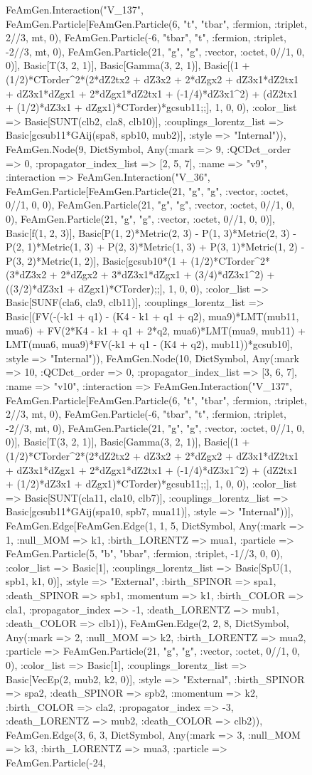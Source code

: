 \documentclass{revtex4}
\begin{document}
\begin{figure}[!htb]
\begin{center}
{FeAmGen.Interaction("V_137", FeAmGen.Particle[FeAmGen.Particle(6, "t", "tbar", :fermion, :triplet, 2//3, mt, 0), FeAmGen.Particle(-6, "tbar", "t", :fermion, :triplet, -2//3, mt, 0), FeAmGen.Particle(21, "g", "g", :vector, :octet, 0//1, 0, 0)], Basic[T(3, 2, 1)], Basic[Gamma(3, 2, 1)], Basic[(1 + (1/2)*CTorder^2*(2*dZ2tx2 + dZ3x2 + 2*dZgx2 + dZ3x1*dZ2tx1 + dZ3x1*dZgx1 + 2*dZgx1*dZ2tx1 + (-1/4)*dZ3x1^2) + (dZ2tx1 + (1/2)*dZ3x1 + dZgx1)*CTorder)*gcsub11;;], 1, 0, 0), :color_list => Basic[SUNT(clb2, cla8, clb10)], :couplings_lorentz_list => Basic[gcsub11*GAij(spa8, spb10, mub2)], :style => "Internal")), FeAmGen.Node(9, Dict{Symbol, Any}(:mark => 9, :QCDct_order => 0, :propagator_index_list => [2, 5, 7], :name => "v9", :interaction => FeAmGen.Interaction("V_36", FeAmGen.Particle[FeAmGen.Particle(21, "g", "g", :vector, :octet, 0//1, 0, 0), FeAmGen.Particle(21, "g", "g", :vector, :octet, 0//1, 0, 0), FeAmGen.Particle(21, "g", "g", :vector, :octet, 0//1, 0, 0)], Basic[f(1, 2, 3)], Basic[P(1, 2)*Metric(2, 3) - P(1, 3)*Metric(2, 3) - P(2, 1)*Metric(1, 3) + P(2, 3)*Metric(1, 3) + P(3, 1)*Metric(1, 2) - P(3, 2)*Metric(1, 2)], Basic[gcsub10*(1 + (1/2)*CTorder^2*(3*dZ3x2 + 2*dZgx2 + 3*dZ3x1*dZgx1 + (3/4)*dZ3x1^2) + ((3/2)*dZ3x1 + dZgx1)*CTorder);;], 1, 0, 0), :color_list => Basic[SUNF(cla6, cla9, clb11)], :couplings_lorentz_list => Basic[(FV(-(-k1 + q1) - (K4 - k1 + q1 + q2), mua9)*LMT(mub11, mua6) + FV(2*K4 - k1 + q1 + 2*q2, mua6)*LMT(mua9, mub11) + LMT(mua6, mua9)*FV(-k1 + q1 - (K4 + q2), mub11))*gcsub10], :style => "Internal")), FeAmGen.Node(10, Dict{Symbol, Any}(:mark => 10, :QCDct_order => 0, :propagator_index_list => [3, 6, 7], :name => "v10", :interaction => FeAmGen.Interaction("V_137", FeAmGen.Particle[FeAmGen.Particle(6, "t", "tbar", :fermion, :triplet, 2//3, mt, 0), FeAmGen.Particle(-6, "tbar", "t", :fermion, :triplet, -2//3, mt, 0), FeAmGen.Particle(21, "g", "g", :vector, :octet, 0//1, 0, 0)], Basic[T(3, 2, 1)], Basic[Gamma(3, 2, 1)], Basic[(1 + (1/2)*CTorder^2*(2*dZ2tx2 + dZ3x2 + 2*dZgx2 + dZ3x1*dZ2tx1 + dZ3x1*dZgx1 + 2*dZgx1*dZ2tx1 + (-1/4)*dZ3x1^2) + (dZ2tx1 + (1/2)*dZ3x1 + dZgx1)*CTorder)*gcsub11;;], 1, 0, 0), :color_list => Basic[SUNT(cla11, cla10, clb7)], :couplings_lorentz_list => Basic[gcsub11*GAij(spa10, spb7, mua11)], :style => "Internal"))], FeAmGen.Edge[FeAmGen.Edge(1, 1, 5, Dict{Symbol, Any}(:mark => 1, :null_MOM => k1, :birth_LORENTZ => mua1, :particle => FeAmGen.Particle(5, "b", "bbar", :fermion, :triplet, -1//3, 0, 0), :color_list => Basic[1], :couplings_lorentz_list => Basic[SpU(1, spb1, k1, 0)], :style => "External", :birth_SPINOR => spa1, :death_SPINOR => spb1, :momentum => k1, :birth_COLOR => cla1, :propagator_index => -1, :death_LORENTZ => mub1, :death_COLOR => clb1)), FeAmGen.Edge(2, 2, 8, Dict{Symbol, Any}(:mark => 2, :null_MOM => k2, :birth_LORENTZ => mua2, :particle => FeAmGen.Particle(21, "g", "g", :vector, :octet, 0//1, 0, 0), :color_list => Basic[1], :couplings_lorentz_list => Basic[VecEp(2, mub2, k2, 0)], :style => "External", :birth_SPINOR => spa2, :death_SPINOR => spb2, :momentum => k2, :birth_COLOR => cla2, :propagator_index => -3, :death_LORENTZ => mub2, :death_COLOR => clb2)), FeAmGen.Edge(3, 6, 3, Dict{Symbol, Any}(:mark => 3, :null_MOM => k3, :birth_LORENTZ => mua3, :particle => FeAmGen.Particle(-24, }
\end{center}
\end{figure}
\end{document}
